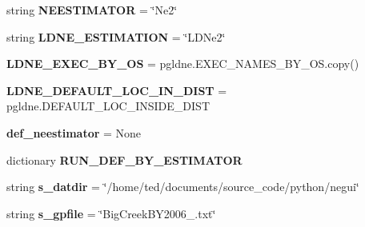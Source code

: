 \begin{DoxyCompactItemize}
\item 
string {\bfseries N\+E\+E\+S\+T\+I\+M\+A\+T\+OR} = \char`\"{}Ne2\char`\"{}\hypertarget{namespacenegui_1_1pgopneestimator_aaac1c57c9da9d831d3cd458d0bb19eae}{}\label{namespacenegui_1_1pgopneestimator_aaac1c57c9da9d831d3cd458d0bb19eae}

\item 
string {\bfseries L\+D\+N\+E\+\_\+\+E\+S\+T\+I\+M\+A\+T\+I\+ON} = \char`\"{}L\+D\+Ne2\char`\"{}\hypertarget{namespacenegui_1_1pgopneestimator_a59c0a93419e79d13ed01e4af4ea339ab}{}\label{namespacenegui_1_1pgopneestimator_a59c0a93419e79d13ed01e4af4ea339ab}

\item 
{\bfseries L\+D\+N\+E\+\_\+\+E\+X\+E\+C\+\_\+\+B\+Y\+\_\+\+OS} = pgldne.\+E\+X\+E\+C\+\_\+\+N\+A\+M\+E\+S\+\_\+\+B\+Y\+\_\+\+O\+S.\+copy()\hypertarget{namespacenegui_1_1pgopneestimator_a0edc45d724bbbd1fcce58ab405e29936}{}\label{namespacenegui_1_1pgopneestimator_a0edc45d724bbbd1fcce58ab405e29936}

\item 
{\bfseries L\+D\+N\+E\+\_\+\+D\+E\+F\+A\+U\+L\+T\+\_\+\+L\+O\+C\+\_\+\+I\+N\+\_\+\+D\+I\+ST} = pgldne.\+D\+E\+F\+A\+U\+L\+T\+\_\+\+L\+O\+C\+\_\+\+I\+N\+S\+I\+D\+E\+\_\+\+D\+I\+ST\hypertarget{namespacenegui_1_1pgopneestimator_abb183ad4b8ffe0e16fa73f174c68b18a}{}\label{namespacenegui_1_1pgopneestimator_abb183ad4b8ffe0e16fa73f174c68b18a}

\item 
{\bfseries def\+\_\+neestimator} = None\hypertarget{namespacenegui_1_1pgopneestimator_a298bff6db819073305c5aad96fe849f9}{}\label{namespacenegui_1_1pgopneestimator_a298bff6db819073305c5aad96fe849f9}

\item 
dictionary {\bfseries R\+U\+N\+\_\+\+D\+E\+F\+\_\+\+B\+Y\+\_\+\+E\+S\+T\+I\+M\+A\+T\+OR}
\item 
string {\bfseries s\+\_\+datdir} = \char`\"{}/home/ted/documents/source\+\_\+code/python/negui\char`\"{}\hypertarget{namespacenegui_1_1pgopneestimator_a5cf5f61553ac8e1d36bdbf79a2e8e13f}{}\label{namespacenegui_1_1pgopneestimator_a5cf5f61553ac8e1d36bdbf79a2e8e13f}

\item 
string {\bfseries s\+\_\+gpfile} = \char`\"{}Big\+Creek\+B\+Y2006\+\_.\+txt\char`\"{}\hypertarget{namespacenegui_1_1pgopneestimator_a2b78915eeca155a1680e89e1fe0d7898}{}\label{namespacenegui_1_1pgopneestimator_a2b78915eeca155a1680e89e1fe0d7898}


\end{DoxyCompactItemize}
